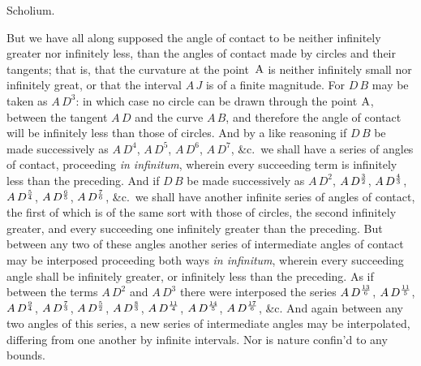 \bigbreak

\centerline{\largesc Scholium.}

\nobreak\bigskip

But we have all along supposed the angle of contact to be neither
infinitely greater nor infinitely less, than the angles of
contact made by circles and their tangents; that is, that the
curvature at the point~${\rm A}$ is neither infinitely small nor
infinitely great, or that the interval $A \, J$ is of a finite
magnitude.  For $D \, B$ may be taken as $A \, D^3$: in which
case no circle can be drawn through the point ${\rm A}$, between
the tangent $A \, D$ and the curve $A \, B$, and therefore the
angle of contact will be infinitely less than those of circles.
And by a like reasoning if $D \, B$ be made successively as
$A \, D^4$, $A \, D^5$, $A \, D^6$, $A \, D^7$, \&c.\ we shall
have a series of angles of contact, proceeding {\it in
infinitum}, wherein every succeeding term is infinitely less than
the preceding.  And if $D \, B$ be made successively as
$A \, D^2$, $A \, D^{3 \over 2}$, $A \, D^{4 \over 3}$,
$A \, D^{5 \over 4}$, $A \, D^{6 \over 5}$, $A \, D^{7 \over 6}$,
\&c.\ we shall have another infinite series of angles of contact,
the first of which is of the same sort with those of circles, the
second infinitely greater, and every succeeding one infinitely
greater than the preceding.  But between any two of these angles
another series of intermediate angles of contact may be
interposed proceeding both ways {\it in infinitum}, wherein every
succeeding angle shall be infinitely greater, or infinitely less
than the preceding.  As if between the terms $A \, D^2$ and
$A \, D^3$ there were interposed the series
$A \, D^{13 \over 6}$,
$A \, D^{11 \over 5}$, $A \, D^{9 \over 4}$,
$A \, D^{7 \over 3}$, $A \, D^{5 \over 2}$,
$A \, D^{8 \over 3}$, $A \, D^{11 \over 4}$,
$A \, D^{14 \over 5}$, $A \, D^{17 \over 6}$, \&c.
And again between any two angles of this series, a new series of
intermediate angles may be interpolated, differing from one
another by infinite intervals.  Nor is nature confin'd to any
bounds.

